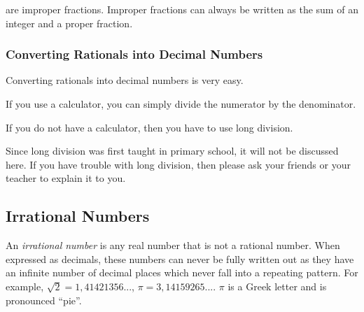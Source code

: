         \label{m38346*id179913}are improper fractions. Improper fractions can always be written as the sum of an integer and a proper fraction.\par 
        \label{m38346*uid66}
            \subsubsection{ Converting Rationals into Decimal Numbers}
            \nopagebreak
          \label{m38346*id179928}Converting rationals into decimal numbers is very easy.\par 
          \label{m38346*id179931}If you use a calculator, you can simply divide the numerator by the denominator.\par 
          \label{m38346*id179935}If you do not have a calculator, then you have to use long division.\par 
          \label{m38346*id179939}Since long division was first taught in primary school, it will not be discussed here. If you have trouble with long division, then please ask your friends or your teacher to explain it to you.\par 
      \label{m38346*uid67}
            \subsection{ Irrational Numbers}
            \nopagebreak
        \label{m38346*id179954}An \textsl{irrational number} is any real number that is not a rational number. When expressed as decimals, these numbers can never be fully written out as they have an infinite number of decimal places which never fall into a repeating pattern. For example, $\sqrt{2}=1,41421356...$, $\pi =3,14159265...$. $\pi $ is a Greek letter and is pronounced ``pie''.\par 
\label{m38346*secfhsst!!!underscore!!!id2554}
